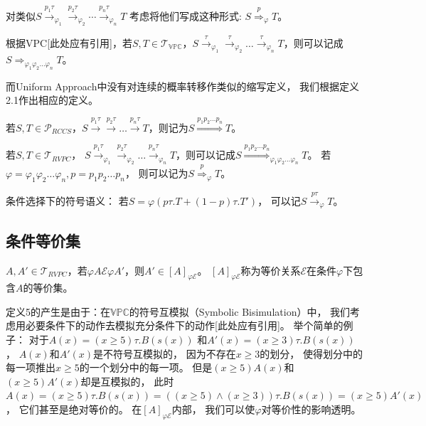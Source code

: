对类似$S\stackrel{p_1\tau}{\rightarrow}_{\varphi_1}\stackrel{p_2\tau}{\rightarrow}_{\varphi_2}\cdots\stackrel{p_n\tau}{\rightarrow}_{\varphi_n} T$
考虑将他们写成这种形式: $S\stackrel{p}{\Rightarrow}_{\varphi} T$。

\begin{definition}\label{def:continous_vpc}
   根据VPC[此处应有引用]，若$S,T\in \mathcal{T}_{\mathbb{VPC}}$，$S\stackrel{\tau}{\rightarrow}_{\varphi_1}\stackrel{\tau}{\rightarrow}_{\varphi_2}\dots \stackrel{\tau}{\rightarrow}_{\varphi_n} T$，则可以记成$S\stackrel{}{\Rightarrow}_{\varphi_1\varphi_2\dots\varphi_n} T$。
\end{definition} 

而Uniform Approach中没有对连续的概率转移作类似的缩写定义，
我们根据定义2.1作出相应的定义。
\begin{definition}
   若$S,T\in \mathcal{P}_{RCCS}$，$S\stackrel{p_1\tau}{\rightarrow}\stackrel{p_2\tau}{\rightarrow}\dots\stackrel{p_n\tau}{\rightarrow}T$，则记为$S\stackrel{p_1p_2\dots p_n}{\Longrightarrow}T$。
\end{definition}

\begin{definition}
   若$S,T\in \mathcal{T}_{RVPC}$，
$S\stackrel{p_1\tau}{\rightarrow}_{\varphi_1}\stackrel{p_2\tau}{\rightarrow}_{\varphi_2}\dots \stackrel{p_n\tau}{\rightarrow}_{\varphi_n} T$，则可以记成$S\stackrel{p_1p_2\dots p_n}{\Longrightarrow}_{\varphi_1\varphi_2\dots\varphi_n} T$。
若$\varphi = \varphi_1\varphi_2\dots \varphi_n, p=p_1p_2\dots p_n$，
则可以记为$S\stackrel{p}{\Rightarrow}_{\varphi} T$。
\end{definition} 

\begin{definition}
   条件选择下的符号语义：
   若$S=\varphi (p\tau.T+(1-p)\tau.T')$，
   可以记$S\stackrel{p\tau}{\rightarrow}_{\varphi} T$。
\end{definition} 
\subsection{条件等价集}
 \begin{definition}
   $A,A'\in \mathcal{T}_{RVPC}$，若$\varphi A \mathcal{E} \varphi A'$，则$A'\in [A]_{\varphi \mathcal{E}}$。
   $[A]_{\varphi \mathcal{E}}$称为等价关系$\mathcal{E}$在条件$\varphi$下包含$A$的等价集。  
 \end{definition} 
 定义5的产生是由于：在$\mathbb{VPC}$的符号互模拟（Symbolic Bisimulation）中，
 我们考虑用必要条件下的动作去模拟充分条件下的动作[此处应有引用]。
 举个简单的例子：
 对于$A(x)=(x\geq 5)\tau.B(s(x))$
 和$A'(x)=(x\geq 3)\tau.B(s(x))$，
 $A(x)$和$A'(x)$是不符号互模拟的，
 因为不存在$x\geq 3$的划分，
 使得划分中的每一项推出$x\geq 5$的一个划分中的每一项。
 但是$(x\geq 5) A(x)$和$(x\geq 5) A'(x)$却是互模拟的，
 此时$A(x)=(x\geq 5)\tau.B(s(x)) = ((x\geq 5)\wedge (x\geq 3))\tau.B(s(x)) = (x\geq 5)A'(x)$，
 它们甚至是绝对等价的。
 在$[A]_{\varphi \mathcal{E}}$内部，
 我们可以使$\varphi$对等价性的影响透明。

